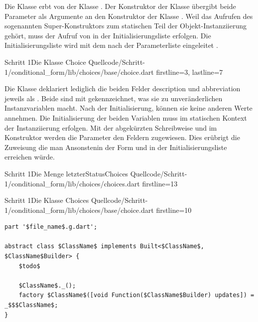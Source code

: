Die Klasse  erbt von der Klasse  . Der Konstruktor der Klasse  übergibt beide Parameter als Argumente an den Konstruktor der Klasse . Weil das Aufrufen des sogenannten Super-Konstruktors zum statischen Teil der Objekt-Instanziierung gehört, muss der Aufruf von  in der Initialisierungsliste erfolgen. Die Initialisierungsliste wird mit dem \IC{:} nach der Parameterliste eingeleitet .

\begin{alexlisting}{Schritt 1}{Die Klasse Choice}
  {Quellcode/Schritt-1/conditional_form/lib/choices/base/choice.dart} 
  {firstline=3, lastline=7}
  \label{lst:Schritt1KlasseChoice}
\end{alexlisting}

Die Klasse  \Lst{\ref{lst:Schritt1KlasseChoice}} deklariert lediglich die beiden Felder description und abbreviation jeweils als  . Beide sind mit  gekennzeichnet, was sie zu unveränderlichen Instanzvariablen macht. Nach der Initialisierung, können sie keine anderen Werte annehmen.  Die Initialisierung der beiden Variablen muss im statischen Kontext der Instanziierung erfolgen. Mit der abgekürzten Schreibweise  und  im Konstruktor  werden die Parameter den Feldern zugewiesen. Dies erübrigt die Zuweisung die man Ansonstenin der Form  und  in der Initialisierungsliste erreichen würde.






\begin{alexlisting}{Schritt 1}{Die Menge letzterStatusChoices}
  {Quellcode/Schritt-1/conditional_form/lib/choices/choices.dart}
  {firstline=13}
  \label{lst:Schritt1DieMengeLetzterStatusChoices}
\end{alexlisting}

\begin{alexlisting}{Schritt 1}{Die Klasse Choices}
  {Quellcode/Schritt-1/conditional_form/lib/choices/base/choice.dart}
  {firstline=10}
  \label{lst:Schritt1KlasseChoices}
\end{alexlisting}

\begin{listing}[h]
  \begin{verbatim}
part '$file_name$.g.dart';

abstract class $ClassName$ implements Built<$ClassName$, $ClassName$Builder> {
    $todo$
    
    $ClassName$._();
    factory $ClassName$([void Function($ClassName$Builder) updates]) = _$$$ClassName$;
}
\end{verbatim}
  \caption[built_value Live Template]{Live Template für die Erstellung von built_value Boilerplate-Code in Android Studio, Quelle: Jetbrains Marketplace Built Value Snippets Plugin}
  \label{lst:BuiltValueLiveTemplate}
\end{listing}



